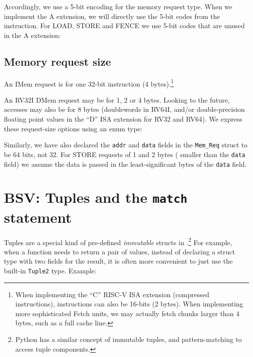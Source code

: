 Accordingly, we use a 5-bit encoding for the memory request type.
When we implement the A extension, we will directly use the 5-bit
codes from the instruction.  For LOAD, STORE and FENCE we use 5-bit
codes that are unused in the A extension:



\subsection{Memory request size}

\label{Sec_Mem_Req_Size}

An IMem request is for one 32-bit instruction (4 bytes).\footnote{When
implementing the ``C'' RISC-V ISA extension (compressed instructions),
instructions can also be 16-bits (2 bytes).  When implementing more
sophisticated Fetch units, we may actually fetch chunks larger than 4
bytes, such as a full cache line.}

An RV32I DMem request may be for 1, 2 or 4 bytes.  Looking to the
future, accesses may also be for 8 bytes (doublewords in RV64I, and/or
double-precision floating point values in the ``D'' ISA extension for
RV32 and RV64).  We express these request-size options using an enum
type:


Similarly, we have also declared the \verb|addr| and \verb|data|
fields in the \verb|Mem_Req| struct to be 64 bits, not 32.  For STORE
requests of 1 and 2 bytes ({\ie} smaller than the \verb|data| field)
we assume the data is passed in the least-significant bytes of the
\verb|data| field.


\section{BSV: Tuples and the {\tt match} statement}

\label{Sec_Tuples}


Tuples are a special kind of pre-defined \emph{immutable} structs in
{\BSV}.\footnote{
Python has a similar concept of immutable tuples, and pattern-matching
to access tuple components.
}
For example, when a function needs to return a pair of values, instead
of declaring a struct type with two fields for the result, it is often
more convenient to just use the built-in \verb|Tuple2| type.  Example:

